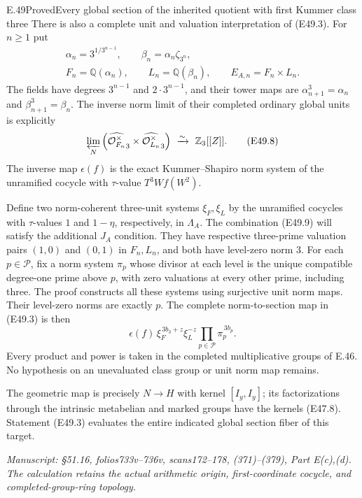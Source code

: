 \begin{statement}{E.49}{Proved}{Every global section of the inherited quotient with first Kummer class three}
There is also a complete unit and valuation
interpretation of (E49.3). For $n\ge1$ put
\[
 \begin{gathered}
 \alpha_n=3^{1/3^{n-1}},\qquad
 \beta_n=\alpha_n\zeta_{3^n},\\
 F_n=\mathbb Q(\alpha_n),\qquad
 L_n=\mathbb Q(\beta_n),\qquad
 E_{A,n}=F_n\times L_n .
 \end{gathered}
 \tag{E49.7}
\]
The fields have degrees $3^{n-1}$ and
$2\cdot3^{n-1}$, and their tower maps
are $\alpha_{n+1}^3=\alpha_n$ and
$\beta_{n+1}^3=\beta_n$. The inverse norm
limit of their completed ordinary global
units is explicitly
\[
 \varprojlim_N
   \left(\widehat{\mathcal O_{F_n}^{\times}}_3
                \times\widehat{\mathcal O_{L_n}^{\times}}_3\right)
 \ \xrightarrow{\sim}\ \mathbb Z_3[[Z]].
 \tag{E49.8}
\]
The inverse map $\epsilon(f)$ is the exact
Kummer--Shapiro norm system of the
unramified cocycle with $\tau$-value
$T^3W f(W^2)$.

Define two norm-coherent three-unit systems
$\xi_F,\xi_L$ by the unramified cocycles
with $\tau$-values $1$ and $1-\eta$,
respectively, in $\Lambda_A$.
The combination (E49.9) will satisfy
the additional $J_A$ condition.
They have respective
three-prime valuation pairs $(1,0)$
and $(0,1)$ in $F_n,L_n$, and both
have level-zero norm $3$.
For each $p\in\mathscr P$, fix a norm
system $\pi_p$ whose divisor at each
level is the unique compatible degree-one
prime above $p$, with zero valuations at
every other prime, including three.
The proof constructs all these systems
using surjective unit norm maps. Their
level-zero norms are exactly $p$.
The complete norm-to-section map in
(E49.3) is then
\[
       \epsilon(f)\,
       \xi_F^{\,3b_3+z}\xi_L^{-z}
              \prod_{p\in\mathscr P}\pi_p^{\,3b_p}.
 \tag{E49.9}
\]
Every product and power is taken in
the completed multiplicative groups
of E.46. No hypothesis on an unevaluated
class group or unit norm map remains.

The geometric map is precisely $N\to H$
with kernel $[I_y,I_y]$; its factorizations
through the intrinsic metabelian and marked
groups have the kernels (E47.8). Statement
(E49.3) evaluates the entire indicated
global section fiber of this target.

\emph{Manuscript: \S51.16, folios733v--736v,
scans172--178, (371)--(379), Part E(c),(d).
The calculation retains the actual arithmetic
origin, first-coordinate cocycle, and
completed-group-ring topology.}
\end{statement}
